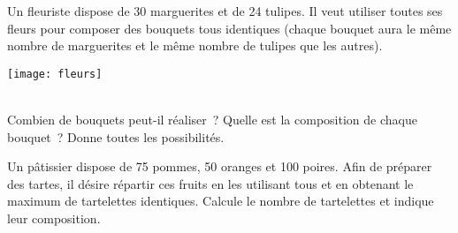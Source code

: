 \begin{exercice}

\vspace{1em}

\begin{minipage}[c]{0.66\linewidth}
Un fleuriste dispose de 30 marguerites et de 24 tulipes. Il veut utiliser toutes ses fleurs pour composer des bouquets tous identiques (chaque bouquet aura le même nombre de marguerites et le même nombre de tulipes que les autres).
 \end{minipage}\hfill%
 \begin{minipage}[c]{0.26\linewidth}
 \texttt{[image: fleurs]}
  \end{minipage} \\[1em]
 Combien de bouquets peut-il réaliser ? Quelle est la composition de chaque bouquet ? Donne toutes les possibilités.
\end{exercice} 

\begin{exercice}[Le pâtissier]
Un pâtissier dispose de 75 pommes, 50 oranges et 100 poires. Afin de préparer des tartes, il désire répartir ces fruits en les utilisant tous et en obtenant le maximum de tartelettes identiques. Calcule le nombre de tartelettes et indique leur composition.
\end{exercice}

